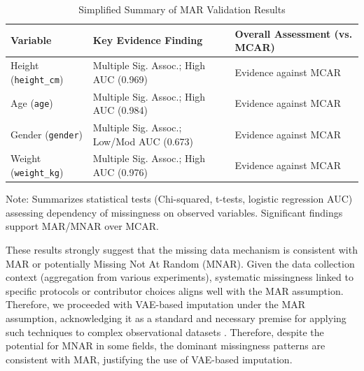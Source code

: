 \begin{table}[htbp]
    \centering
    \caption{Simplified Summary of MAR Validation Results}
    \label{tab:MAR_Summary}
    \begin{tabular}{l l l}
        \toprule
        Variable & Key Evidence Finding & Overall Assessment (vs. MCAR) \\
        \midrule
        Height (\texttt{height\_cm}) & Multiple Sig. Assoc.; High AUC (0.969) & Evidence against MCAR \\
        Age (\texttt{age}) & Multiple Sig. Assoc.; High AUC (0.984) & Evidence against MCAR \\
        Gender (\texttt{gender}) & Multiple Sig. Assoc.; Low/Mod AUC (0.673) & Evidence against MCAR \\
        Weight (\texttt{weight\_kg}) & Multiple Sig. Assoc.; High AUC (0.976) & Evidence against MCAR \\
        \bottomrule
    \end{tabular}
    \vspace{1ex} %
    \footnotesize %
    Note: Summarizes statistical tests (Chi-squared, t-tests, logistic regression AUC) assessing dependency of missingness on observed variables. Significant findings support MAR/MNAR over MCAR.
\end{table}

These results strongly suggest that the missing data mechanism is consistent with MAR or potentially Missing Not At Random (MNAR). Given the data collection context (aggregation from various experiments), systematic missingness linked to specific protocols or contributor choices aligns well with the MAR assumption. Therefore, we proceeded with VAE-based imputation under the MAR assumption, acknowledging it as a standard and necessary premise for applying such techniques to complex observational datasets \cite{Rubin1976}. Therefore, despite the potential for MNAR in some fields, the dominant missingness patterns are consistent with MAR, justifying the use of VAE-based imputation.


